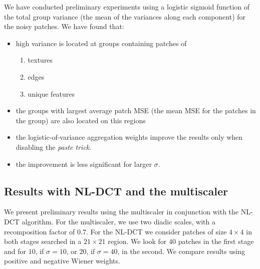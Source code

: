 \documentclass{ipol}
\begin{document}
We have conducted preliminary experiments using a logistic sigmoid function of the 
total group variance (the mean of the variances along each component) for the noisy
patches. We have found that:
\begin{itemize}
	\item high variance is located at groups containing patches of
		\begin{enumerate}
			\item textures
			\item edges
			\item unique features
		\end{enumerate}
	\item the groups with largest average patch MSE (the mean MSE for the patches in
		the group) are also located on this regions
	\item the logistic-of-variance aggregation weights improve the results only when disabling the
		\textit{paste trick}. 
	\item the improvement is less significant for larger $\sigma$.
\end{itemize}


 


\subsection{Results with NL-DCT and the multiscaler}

We present preliminary results using the multiscaler in conjunction with the NL-DCT algorithm.
For the multiscaler, we use two diadic scales, with a recomposition factor of $0.7$.
For the NL-DCT we consider patches of size $4\times 4$ in both stages searched in a $21\times 21$ region.
We look for $40$ patches in the first stage and for $10$, if $\sigma = 10$, or $20$,
if $\sigma= 40$, in the second. We compare results using positive and negative Wiener weights.
\end{document}
